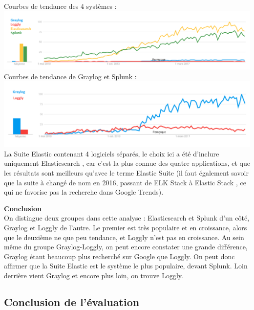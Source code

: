 \documentclass[paper=a4, fontsize=11pt]{scrartcl}
\begin{document}
Courbes de tendance des 4 systèmes :\\
\includegraphics[width=18cm]{img/screenshots/Tendance_4.png}\\
Courbes de tendance de Graylog et Splunk :\\
\includegraphics[width=18cm]{img/screenshots/Tendance_2.png}\\

La Suite Elastic contenant 4 logiciels séparés, le choix ici a été d'inclure uniquement \og Elasticsearch \fg, car c'est la plus connue des quatre applications, et que les résultats sont meilleurs qu'avec le terme \og Elastic Suite \fg (il faut également savoir que la suite à changé de nom en 2016, passant de \og ELK Stack \fg à \og Elastic Stack \fg, ce qui ne favorise pas la recherche dans Google Trends).

\textbf{Conclusion} \\
On distingue deux groupes dans cette analyse : Elasticsearch et Splunk d'un côté, Graylog et Loggly de l'autre. Le premier est très populaire et en croissance, alors que le deuxième ne que peu tendance, et Loggly n'est pas en croissance. Au sein même du groupe Graylog-Loggly, on peut encore constater une grande différence, Graylog étant beaucoup plus recherché sur Google que Loggly. On peut donc affirmer que la Suite Elastic est le système le plus populaire, devant Splunk. Loin derrière vient Graylog et encore plus loin, on trouve Loggly.

\subsection{Conclusion de l'évaluation}
\end{document}
